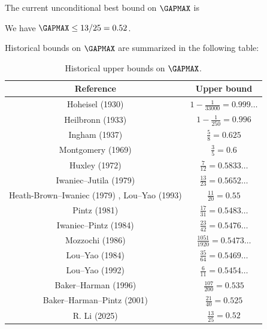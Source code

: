 The current unconditional best bound on $\GAPMAX$ is

\begin{theorem}\cite{li_number_2025}\label{bhp-thm} We have $\GAPMAX \leq 13/25 = 0.52$.
\end{theorem}

Historical bounds on $\GAPMAX$ are summarized in the following table:

\begin{table}[ht]
    \caption{Historical upper bounds on $\GAPMAX$.}
    \label{gapmax-table}
    \centering
    \renewcommand{\arraystretch}{1.2}
    \begin{tabular}{|c|c|}
    \hline
    Reference & Upper bound \\
    \hline
    Hoheisel (1930) \cite{hoheisel_1930} & $1 - \frac{1}{33000} = 0.999\dots$ \\
    \hline
    Heilbronn (1933) \cite{heilbronn_1933} & $1 - \frac{1}{250} = 0.996$ \\
    \hline
    Ingham (1937) \cite{ingham_difference_1937} & $\frac{5}{8} = 0.625$ \\
    \hline
    Montgomery (1969) \cite{montgomery_1969} & $\frac{3}{5} = 0.6$ \\
    \hline
    Huxley (1972) \cite{Huxley} & $\frac{7}{12} = 0.5833\dots$ \\
    \hline
    Iwaniec--Jutila (1979)\cite{iwaniec-jutila} & $\frac{13}{23} = 0.5652\dots$ \\
    \hline
    Heath-Brown--Iwaniec (1979) \cite{heathbrown_iwaniec_1979}, Lou--Yao (1993) \cite{lou_yao_number_1993}& $\frac{11}{20} = 0.55$ \\
    \hline
    Pintz (1981) \cite{pintz_1981} & $\frac{17}{31} = 0.5483\dots$ \\
    \hline
    Iwaniec--Pintz (1984) \cite{iwaniec-pintz} & $\frac{23}{42} = 0.5476\dots$\\
    \hline
    Mozzochi (1986) \cite{mozzochi-consecutive} & $\frac{1051}{1920} = 0.5473\dots$ \\
    \hline
    Lou--Yao (1984) \cite{LouYao3564} & $\frac{35}{64} = 0.5469\dots$\\
    \hline
    Lou--Yao (1992) \cite{lou-yao-chebychev} & $\frac{6}{11} = 0.5454\dots$\\
    \hline
    Baker--Harman (1996) \cite{baker-harman} & $\frac{107}{200} = 0.535$\\
    \hline
    Baker--Harman--Pintz (2001) \cite{baker-harman-pintz} & $\frac{21}{40} = 0.525$ \\
    \hline
    R. Li (2025) \cite{li_number_2025} & $\frac{13}{25} = 0.52$\\
    \hline
    \end{tabular}
    \end{table}

